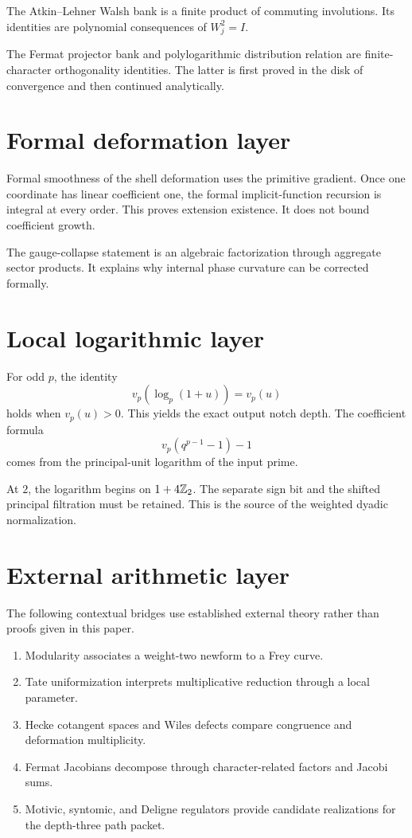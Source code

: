 The Atkin--Lehner Walsh bank is a finite product of commuting involutions. Its identities are polynomial consequences of $W_j^2=I$.

The Fermat projector bank and polylogarithmic distribution relation are finite-character orthogonality identities. The latter is first proved in the disk of convergence and then continued analytically.

\section{Formal deformation layer}
Formal smoothness of the shell deformation uses the primitive gradient. Once one coordinate has linear coefficient one, the formal implicit-function recursion is integral at every order. This proves extension existence. It does not bound coefficient growth.

The gauge-collapse statement is an algebraic factorization through aggregate sector products. It explains why internal phase curvature can be corrected formally.

\section{Local logarithmic layer}
For odd $p$, the identity
\[
 v_p(\log_p(1+u))=v_p(u)
\]
holds when $v_p(u)>0$. This yields the exact output notch depth. The coefficient formula
\[
 v_p(q^{p-1}-1)-1
\]
comes from the principal-unit logarithm of the input prime.

At $2$, the logarithm begins on $1+4\mathbb Z_2$. The separate sign bit and the shifted principal filtration must be retained. This is the source of the weighted dyadic normalization.

\section{External arithmetic layer}
The following contextual bridges use established external theory rather than proofs given in this paper.

\begin{enumerate}[leftmargin=1.5em]
\item Modularity associates a weight-two newform to a Frey curve.
\item Tate uniformization interprets multiplicative reduction through a local parameter.
\item Hecke cotangent spaces and Wiles defects compare congruence and deformation multiplicity.
\item Fermat Jacobians decompose through character-related factors and Jacobi sums.
\item Motivic, syntomic, and Deligne regulators provide candidate realizations for the depth-three path packet.
\end{enumerate}

